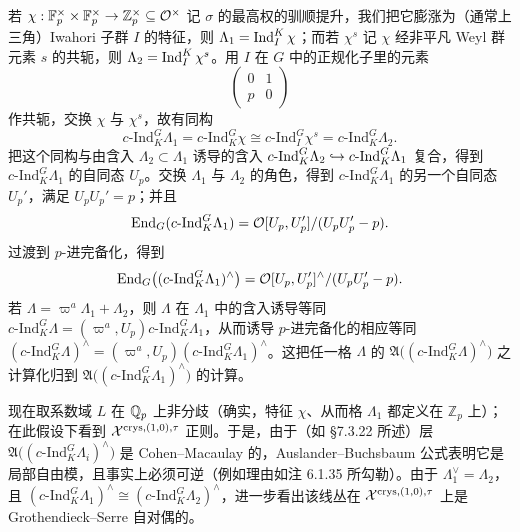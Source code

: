 若 $\chi:\mathbb F_p^\times\times\mathbb F_p^\times\to\mathbb Z_p^\times\subseteq\mathcal{O}^\times$ 记 $\sigma$ 的最高权的驯顺提升，我们把它膨涨为（通常上三角）Iwahori 子群 $I$ 的特征，则 $\Lambda_1=\operatorname{Ind}_I^K\chi$；而若 $\chi^s$ 记 $\chi$ 经非平凡 Weyl 群
元素 $s$ 的共轭，则 $\Lambda_2=\operatorname{Ind}_I^K\chi^s$。用 $I$ 在 $G$ 中的正规化子里的元素
\[
\begin{pmatrix}0&1\\p&0\end{pmatrix}
\]
作共轭，交换 $\chi$ 与 $\chi^s$，故有同构
\[
c\text{-Ind}_K^G\Lambda_1=c\text{-Ind}_K^G\chi\cong c\text{-Ind}_I^G\chi^s=c\text{-Ind}_K^G\Lambda_2.
\]
把这个同构与由含入 $\Lambda_2\subset\Lambda_1$ 诱导的含入 $c\text{-Ind}_K^G\Lambda_2\hookrightarrow c\text{-Ind}_K^G\Lambda_1$ 复合，得到 $c\text{-Ind}_K^G\Lambda_1$ 的自同态 $U_p$。交换 $\Lambda_1$ 与 $\Lambda_2$ 的角色，得到 $c\text{-Ind}_K^G\Lambda_1$ 的另一个自同态 $U_p'$，满足 $U_pU_p'=p$；并且
\[
\operatorname{End}_G(c\text{-Ind}_K^G\Lambda_1)=\mathcal{O}[U_p,U_p']/(U_pU_p'-p).
\]
过渡到 $p$-进完备化，得到
\[
\operatorname{End}_G\bigl((c\text{-Ind}_K^G\Lambda_1)^\wedge\bigr)=\mathcal{O}[U_p,U_p']^\wedge/(U_pU_p'-p).
\]
若 $\Lambda=\varpi^a\Lambda_1+\Lambda_2$，则 $\Lambda$ 在 $\Lambda_1$ 中的含入诱导等同 $c\text{-Ind}_K^G\Lambda=(\varpi^a,U_p)c\text{-Ind}_K^G\Lambda_1$，从而诱导 $p$-进完备化的相应等同 $(c\text{-Ind}_K^G\Lambda)^\wedge=(\varpi^a,U_p)(c\text{-Ind}_K^G\Lambda_1)^\wedge$。这把任一格 $\Lambda$ 的 $\mathfrak A\bigl((c\text{-Ind}_K^G\Lambda)^\wedge\bigr)$ 之计算化归到 $\mathfrak A\bigl((c\text{-Ind}_K^G\Lambda_1)^\wedge\bigr)$ 的计算。

现在取系数域 $L$ 在 $\mathbb{Q}_p$ 上非分歧（确实，特征 $\chi$、从而格 $\Lambda_1$ 都定义在 $\mathbb Z_p$ 上）；在此假设下看到 $\mathcal{X}^{\mathrm{crys},(1,0),\tau}$ 正则。于是，由于（如 §7.3.22 所述）层 $\mathfrak A\bigl((c\text{-Ind}_K^G\Lambda_i)^\wedge\bigr)$ 是 Cohen--Macaulay 的，Auslander--Buchsbaum 公式表明它是局部自由模，且事实上必须可逆（例如理由如注 6.1.35 所勾勒）。由于 $\Lambda_1^\vee=\Lambda_2$，且 $(c\text{-Ind}_K^G\Lambda_1)^\wedge\cong(c\text{-Ind}_K^G\Lambda_2)^\wedge$，进一步看出该线丛在 $\mathcal{X}^{\mathrm{crys},(1,0),\tau}$ 上是 Grothendieck--Serre 自对偶的。

